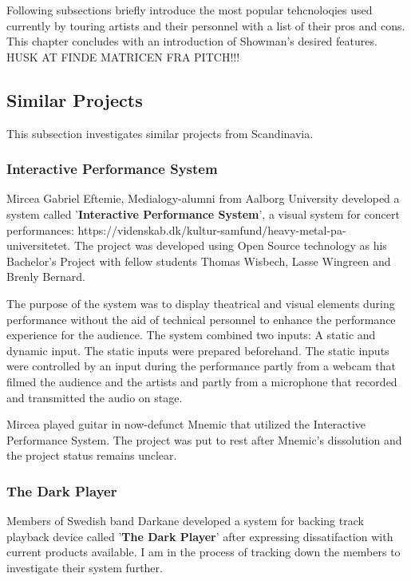 Following subsections briefly introduce the most popular tehcnoloqies used currently by touring artists and their personnel with a list of their pros and cons. This chapter concludes with an introduction of Showman's desired features. \\

HUSK AT FINDE MATRICEN FRA PITCH!!!

\subsection{Similar Projects}
This subsection investigates similar projects from Scandinavia. \\

\subsubsection{Interactive Performance System}
Mircea Gabriel Eftemie, Medialogy-alumni from Aalborg University developed a system called '\textbf{Interactive Performance System}', a visual system for concert performances: https://videnskab.dk/kultur-samfund/heavy-metal-pa-universitetet. The project was developed using Open Source technology as his Bachelor's Project with fellow students Thomas Wisbech, Lasse Wingreen and Brenly Bernard. \newline

The purpose of the system was to display theatrical and visual elements during performance without the aid of technical personnel to enhance the performance experience for the audience. The system combined two inputs: A static and dynamic input. The static inputs were prepared beforehand. The static inputs were controlled by an input during the performance partly from a webcam that filmed the audience and the artists and partly from a microphone that recorded and transmitted the audio on stage. \newline

Mircea played guitar in now-defunct Mnemic that utilized the Interactive Performance System. The project was put to rest after Mnemic's dissolution and the project status remains unclear. \\

\subsubsection{The Dark Player}
Members of Swedish band Darkane developed a system for backing track playback device called '\textbf{The Dark Player}' after expressing dissatifaction with current products available. I am in the process of tracking down the members to investigate their system further. \\

